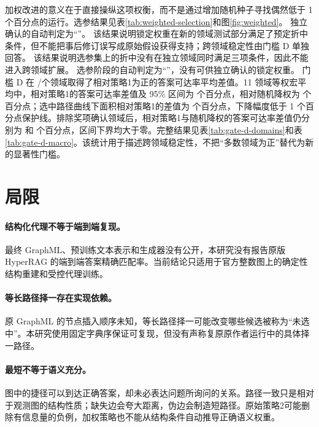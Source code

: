 \documentclass[UTF8,11pt]{ctexart}
\begin{document}
加权改进的意义在于直接操纵这项权衡，而不是通过增加随机种子寻找偶然低于 1 个百分点的运行。选参结果见表\ref{tab:weighted-selection}和图\ref{fig:weighted}。
\ifweightedconfirmationavailable
独立确认的自动判定为“\WeightedConfirmationDecision”。
\ifweightedconfirmationpassed
该结果说明锁定权重在新的领域测试部分满足了预定折中条件，但不能把事后修订误写成原始假设获得支持；跨领域稳定性由门槛 D 单独回答。
\else
该结果说明选参集上的折中没有在独立领域同时满足三项条件，因此不能进入跨领域扩展。
\fi
\else
选参阶段的自动判定为“\WeightedSelectionDecision”，没有可供独立确认的锁定权重。
\fi
\ifgatedavailable
门槛 D 在 \GateDPositiveDomainCount/\GateDDomainCount 个领域取得了相对策略1为正的答案可达率平均差值。11 领域等权宏平均中，相对策略1的答案可达率差值及 95\% 区间为 \GateDVsStrategyOne 个百分点，相对随机降权为 \GateDVsRandomWeighted 个百分点；选中路径曲线下面积相对策略1的差值为 \GateDPrecisionVsStrategyOne 个百分点，下降幅度低于 1 个百分点保护线。排除奖项确认领域后，相对策略1与随机降权的答案可达率差值仍分别为 \GateDExcludingConfirmationVsStrategyOne 和 \GateDExcludingConfirmationVsRandomWeighted 个百分点，区间下界均大于零。完整结果见表\ref{tab:gate-d-domains}和表\ref{tab:gate-d-macro}。该统计用于描述跨领域稳定性，不把“多数领域为正”替代为新的显著性门槛。
\fi

\section{局限}

\paragraph{结构化代理不等于端到端复现。}
最终 GraphML、预训练文本表示和生成器没有公开，本研究没有报告原版 HyperRAG 的端到端答案精确匹配率。当前结论只适用于官方整数图上的确定性结构重建和受控代理训练。

\paragraph{等长路径择一存在实现依赖。}
原 GraphML 的节点插入顺序未知，等长路径择一可能改变哪些候选被称为“未选中”。本研究使用固定字典序保证可复现，但没有声称复原原作者运行中的具体择一路径。

\paragraph{最短不等于语义充分。}
图中的捷径可以到达正确答案，却未必表达问题所询问的关系。路径一致只是相对于观测图的结构性质；缺失边会夸大距离，伪边会制造短路径。原始策略2可能删除有信息量的负例，加权策略也不能从结构条件自动推导正确语义权重。
\end{document}
